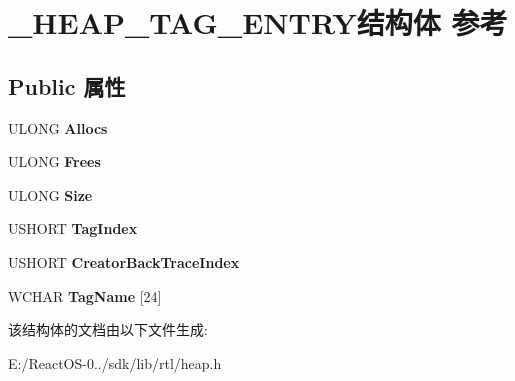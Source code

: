 \hypertarget{struct___h_e_a_p___t_a_g___e_n_t_r_y}{}\section{\+\_\+\+H\+E\+A\+P\+\_\+\+T\+A\+G\+\_\+\+E\+N\+T\+R\+Y结构体 参考}
\label{struct___h_e_a_p___t_a_g___e_n_t_r_y}
\subsection*{Public 属性}
\begin{DoxyCompactItemize}
\item 
\mbox{\label{struct___h_e_a_p___t_a_g___e_n_t_r_y_a4c4bc061c0b33016f08b21a93018da4c}} 
U\+L\+O\+NG {\bfseries Allocs}
\item 
\mbox{\label{struct___h_e_a_p___t_a_g___e_n_t_r_y_a61e428d9701ad26ae2bec15f539b9faf}} 
U\+L\+O\+NG {\bfseries Frees}
\item 
\mbox{\label{struct___h_e_a_p___t_a_g___e_n_t_r_y_a4b7718bc78ca237cab0c808c72ea43bd}} 
U\+L\+O\+NG {\bfseries Size}
\item 
\mbox{\label{struct___h_e_a_p___t_a_g___e_n_t_r_y_a1e527d65d33130a008ccef54429c0a23}} 
U\+S\+H\+O\+RT {\bfseries Tag\+Index}
\item 
\mbox{\label{struct___h_e_a_p___t_a_g___e_n_t_r_y_a61099ceac40d6cb8144c22d06abe1b8d}} 
U\+S\+H\+O\+RT {\bfseries Creator\+Back\+Trace\+Index}
\item 
\mbox{\label{struct___h_e_a_p___t_a_g___e_n_t_r_y_ae34e72fe31d2ef99e0cbc72e08c3fe7a}} 
W\+C\+H\+AR {\bfseries Tag\+Name} \mbox{[}24\mbox{]}
\end{DoxyCompactItemize}


该结构体的文档由以下文件生成\+:\begin{DoxyCompactItemize}
\item 
E\+:/\+React\+O\+S-\/0../sdk/lib/rtl/heap.\+h\end{DoxyCompactItemize}
